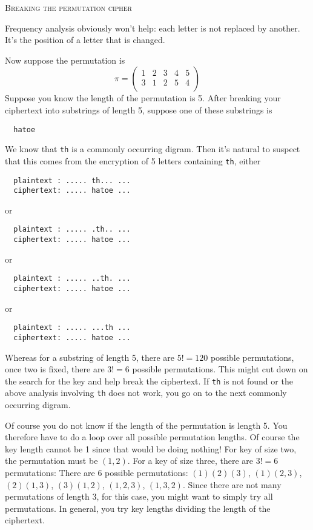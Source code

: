 




\textsc{Breaking the permutation cipher}

Frequency analysis obviously won't help: each letter is not replaced by another.
It's the position of a letter that is changed.

Now suppose the permutation is
\[
  \pi =
  \begin{pmatrix}
    1 & 2 & 3 & 4 & 5 \\
    3 & 1 & 2 & 5 & 4 \\
  \end{pmatrix}
\]
Suppose you know the length of the permutation is 5.
After breaking your ciphertext into substrings of length 5,
suppose one of these substrings is
\begin{Verbatim}
  hatoe
\end{Verbatim}
We know that \verb!th! is a commonly occurring digram.
Then it's natural to suspect that this comes from the encryption of 5 letters containing
\verb!th!,
either
\begin{Verbatim}
  plaintext : ..... th... ...
  ciphertext: ..... hatoe ...
\end{Verbatim}
or
\begin{Verbatim}
  plaintext : ..... .th.. ...
  ciphertext: ..... hatoe ...
\end{Verbatim}
or
\begin{Verbatim}
  plaintext : ..... ..th. ...
  ciphertext: ..... hatoe ...
\end{Verbatim}
or
\begin{Verbatim}
  plaintext : ..... ...th ...
  ciphertext: ..... hatoe ...
\end{Verbatim}
Whereas for a substring of length 5, there are $5! = 120$ possible
permutations,
once two is fixed, there are $3! = 6$ possible permutations.
This might cut down on the search for the key and help break the ciphertext.
If \verb!th! is not found or the above analysis involving \verb!th!
does not work, you go on to the next commonly occurring digram.

Of course you do not know if the length of the permutation is length 5.
You therefore have to do a loop over all possible permutation lengths.
Of course the key length cannot be 1 since that would be doing nothing!
For key of size two, the permutation must be $(1, 2)$.
For a key of size three, there are $3! = 6$ permutations:
There are 6 possible permutations:
$(1)(2)(3)$, $(1)(2, 3)$, $(2)(1, 3)$, $(3)(1, 2)$,
$(1, 2, 3)$, $(1, 3, 2)$.
Since there are not many permutations of length 3, for this case,
you might want to simply try all permutations.
In general, you try key lengths dividing the length of the ciphertext.

